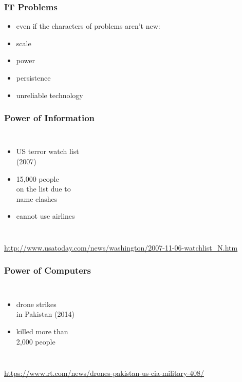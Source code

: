 \documentclass[dvipsnames]{beamer}
\begin{document}
\begin{frame}
  \frametitle{IT Problems}

  \begin{itemize}
    \item even if the characters of problems aren't new:

    \medskip
    \item scale
    \item power
    \item persistence
    \item unreliable technology
  \end{itemize}
\end{frame}

\begin{frame}
  \frametitle{Power of Information}

  \begin{columns}

    \begin{itemize}
      \item US terror watch list\\
        (2007)
      \item 15,000 people\\
        on the list due to\\
        name clashes
      \item cannot use airlines
    \end{itemize}
  \end{columns}

  \medskip
  \tiny{\url{http://www.usatoday.com/news/washington/2007-11-06-watchlist_N.htm}}
\end{frame}

\begin{frame}
  \frametitle{Power of Computers}

  \begin{columns}

    \begin{itemize}
      \item drone strikes\\
        in Pakistan (2014)
      \item killed more than\\
        2,000 people
    \end{itemize}
  \end{columns}

  \medskip
  \tiny{\url{https://www.rt.com/news/drones-pakistan-us-cia-military-408/}}
\end{frame}
\end{document}
